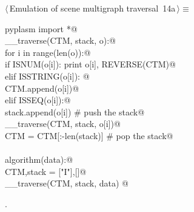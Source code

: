 \documentclass[11pt,oneside]{article}	%
\begin{document}
\begin{flushleft} \small \label{scrap26}
\protect{}$\langle\,$Emulation of scene multigraph traversal\nobreak\ {\footnotesize 14a}$\,\rangle\equiv$
\vspace{-1ex}
\begin{list}{}{} \item
\mbox{}\verb@from pyplasm import *@\\
\mbox{}\verb@def __traverse(CTM, stack, o):@\\
\mbox{}\verb@    for i in range(len(o)):@\\
\mbox{}\verb@        if ISNUM(o[i]): print o[i], REVERSE(CTM)@\\
\mbox{}\verb@        elif ISSTRING(o[i]): @\\
\mbox{}\verb@            CTM.append(o[i])@\\
\mbox{}\verb@        elif ISSEQ(o[i]):@\\
\mbox{}\verb@            stack.append(o[i])            # push the stack@\\
\mbox{}\verb@            __traverse(CTM, stack, o[i])@\\
\mbox{}\verb@            CTM = CTM[:-len(stack)]       # pop the stack@\\
\mbox{}\verb@@\\
\mbox{}\verb@def algorithm(data):@\\
\mbox{}\verb@    CTM,stack = ["I"],[]@\\
\mbox{}\verb@    __traverse(CTM, stack, data)  @\\
\mbox{}\verb@@{\NWsep}
\end{list}
\vspace{-1ex}
\footnotesize\addtolength{\baselineskip}{-1ex}
\begin{list}{}{\setlength{\itemsep}{-\parsep}\setlength{\itemindent}{-\leftmargin}}
\item {\NWtxtMacroNoRef}.
\end{list}
\end{flushleft}
\end{document}
